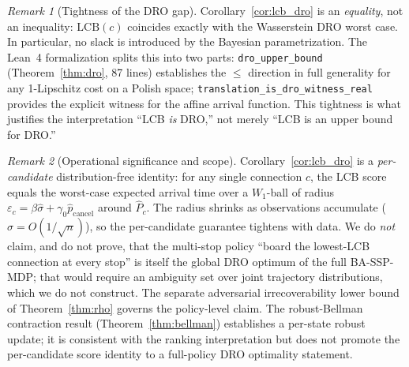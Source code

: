 \documentclass[11pt]{article}
\theoremstyle{definition}
\theoremstyle{remark}
\newtheorem{remark}{Remark}
\begin{document}
\begin{remark}[Tightness of the DRO gap]\label{rem:tight}
Corollary~\ref{cor:lcb_dro} is an \emph{equality}, not an inequality:
$\mathrm{LCB}(c)$ coincides exactly with the Wasserstein DRO worst case.
In particular, no slack is introduced by the Bayesian parametrization.
The Lean~4 formalization splits this into two parts:
\texttt{dro\_upper\_bound} (Theorem~\ref{thm:dro}, 87 lines) establishes
the $\leq$ direction in full generality for any 1-Lipschitz cost on a
Polish space; \texttt{translation\_is\_dro\_witness\_real} provides the
explicit witness for the affine arrival function. This tightness is
what justifies the interpretation ``LCB \emph{is} DRO,'' not merely
``LCB is an upper bound for DRO.''
\end{remark}

\begin{remark}[Operational significance and scope]
Corollary~\ref{cor:lcb_dro} is a \emph{per-candidate} distribution-free
identity: for any single connection $c$, the LCB score equals the
worst-case expected arrival time over a $W_1$-ball of radius
$\varepsilon_c = \beta\hat\sigma + \gamma_0\hat{p}_{\mathrm{cancel}}$
around $\hat P_c$. The radius shrinks as observations accumulate
($\hat\sigma = O(1/\sqrt{n})$), so the per-candidate guarantee
tightens with data. We do \emph{not} claim, and do not prove, that the
multi-stop policy ``board the lowest-LCB connection at every stop''
is itself the global DRO optimum of the full BA-SSP-MDP; that would
require an ambiguity set over joint trajectory distributions, which we
do not construct. The separate adversarial irrecoverability lower
bound of Theorem~\ref{thm:rho} governs the policy-level claim. The robust-Bellman contraction
result (Theorem~\ref{thm:bellman}) establishes a per-state robust
update; it is consistent with the ranking interpretation but does
not promote the per-candidate score identity to a full-policy DRO
optimality statement.
\end{remark}
\end{document}

